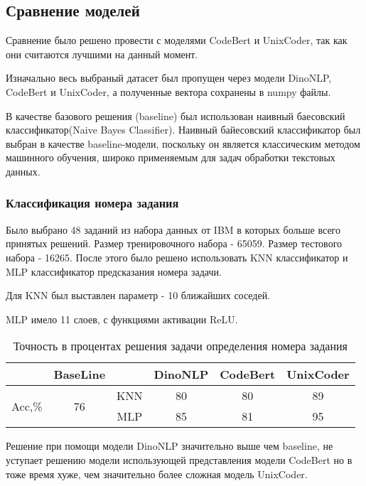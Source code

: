 \documentclass[../part_3.tex]{subfiles}
\begin{document}
\subsection{Сравнение моделей}
\par Сравнение было решено провести с моделями CodeBert\cite{} и UnixCoder\cite{}, так как они считаются лучшими на данный момент.
\par Изначально весь выбраный датасет был пропущен через модели DinoNLP, CodeBert и UnixCoder, а полученные вектора сохранены в numpy файлы.
\par В качестве базового решения (baseline) был использован наивный баесовский классификатор(Naive Bayes Classifier). Наивный байесовский классификатор был выбран в качестве baseline-модели, поскольку он является классическим методом машинного обучения, широко применяемым для задач обработки текстовых данных.  
\subsubsection{Классификация номера задания}
\par Было выбрано 48 заданий из набора данных от IBM в которых больше всего принятых решений. Размер тренировочного набора - 65059. Размер тестового набора - 16265. После этого было решено использовать KNN классификатор и MLP классификатор предсказания номера задачи.
\par Для KNN был выставлен параметр - 10 ближайших соседей.
\par MLP имело 11 слоев, с функциями активации ReLU.
\begin{table}[H]
    \centering
    \begin{tabular}{|c|c||c|c|c|c|}\hline 
        &BaseLine&&DinoNLP&CodeBert&UnixCoder\\ \hline 
        \multirow{2}{*}{Acc,\%}&\multirow{2}{*}{76}&KNN&80&80&89\\\cline{3-6}
        &&MLP&85&81&95\\\hline
    \end{tabular}  
    \caption{Точность в процентах решения задачи определения номера задания}
\end{table}
\par Решение при помощи модели DinoNLP значительно выше чем baseline, не уступает решению модели использующей представления модели CodeBert но в тоже время хуже, чем значительно более сложная модель UnixCoder.
\end{document}
